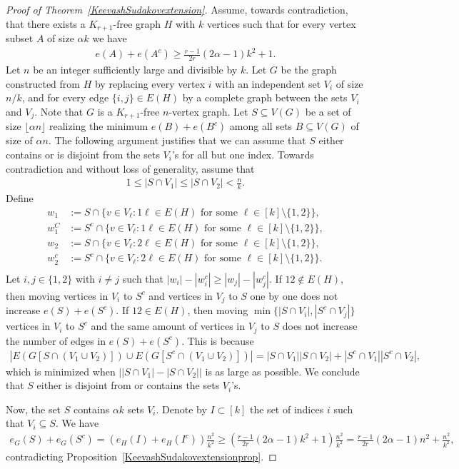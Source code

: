 \documentclass[11pt]{article}
\theoremstyle{definition}
\numberwithin{theo}{section}
\begin{document}
\begin{proof}[Proof of Theorem~\ref{KeevashSudakovextension}]
Assume, towards contradiction, that there exists a $K_{r+1}$-free graph $H$ with $k$ vertices such that for every vertex subset $A$ of size $\alpha k$ we have
\begin{align*}
    e(A)+e(A^c)\geq  \frac{r-1}{2r}(2\alpha-1) k^2  + 1.
\end{align*}
Let $n$ be an integer sufficiently large and divisible by $k$.
Let $G$ be the graph constructed from $H$ by replacing every vertex $i$ with an independent set $V_i$ of size $n/k$, and for every edge $\{i, j\}\in E(H)$ by a complete graph between the sets $V_i$ and $V_j$. Note that $G$ is a $K_{r+1}$-free $n$-vertex graph. Let $S\subseteq V(G)$ be a set of size $\lfloor \alpha n\rfloor$ realizing the minimum $e(B)+e(B^c)$ among all sets $B\subseteq V(G)$ of size of $\alpha n$. The following argument justifies that we can assume that $S$ either contains or is disjoint from the sets $V_i$'s for all but one index. Towards contradiction and without loss of generality, assume that 
\begin{align*}
    1 \leq|S\cap V_1|\leq |S\cap V_2| <\frac{n}{k}.
\end{align*}
Define
\begin{align*}
w_1&:=S\cap  \{v\in V_\ell :1\ell\in E(H) \text{ for some } \ell\in[k]\setminus\{1,2\} \}, \\
w_1^C&:=S^c\cap  \{v\in V_\ell :1\ell\in E(H) \text{ for some } \ell\in[k]\setminus\{1,2\} \}, \\
w_2&:=S\cap  \{v\in V_\ell :2\ell\in E(H) \text{ for some } \ell\in[k]\setminus\{1,2\} \}, \\
w_2^c&:=S^c\cap \{v\in V_\ell :2\ell\in E(H) \text{ for some } \ell\in[k]\setminus\{1,2\} \}. \\
\end{align*}
Let $i,j\in\{1,2\}$ with $i\neq j$ such that $|w_i|-|w_i^c|\geq |w_j|-|w_j^c|$. If $12\notin E(H)$, then moving vertices in $V_i$ to $S^c$ and vertices in $V_j$ to $S$ one by one does not increase $e(S)+e(S^c)$. If $12\in E(H)$, then moving $\min\{|S\cap V_i|,|S^c\cap V_j| \}$ vertices in $V_i$ to $S^c$ and the same amount of vertices in $V_j$ to $S$ does not increase the number of edges in $e(S)+e(S^c)$. This is because 
\begin{align*}
    |E(G[S\cap (V_1\cup V_2)])\cup E(G[S^c \cap (V_1\cup V_2)])|=|S\cap V_1||S\cap V_2|+|S^c\cap V_1||S^c\cap V_2|,
\end{align*}
which is minimized when $\big\vert|S\cap V_1|-|S\cap V_2|\big\vert$ is as large as possible. We conclude that $S$ either is disjoint from or contains the sets $V_i$'s.

Now, the set $S$ contains $ \alpha k $ sets $V_i$. Denote by $I\subset [k]$ the set of indices $i$ such that $V_i\subseteq S$. We have
\begin{align*}
    e_G(S)+e_G(S^c)=(e_H(I)+e_H(I^c))\frac{n^2}{k^2}\geq \left( \frac{r-1}{2r}(2\alpha-1) k^2 + 1 \right)\frac{n^2}{k^2}=\frac{r-1}{2r}(2\alpha-1) n^2 +\frac{n^2}{k^2},
\end{align*}
contradicting Proposition~\ref{KeevashSudakovextensionprop}. 

 
\end{proof}
\end{document}

